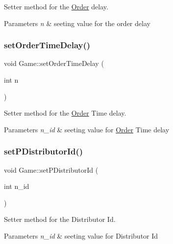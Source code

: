 Setter method for the \hyperlink{class_order}{Order} delay. 


\begin{DoxyParams}{Parameters}
{\em n} & seeting value for the order delay \\
\hline
\end{DoxyParams}
\mbox{\label{class_game_af127a9a8e81e7863d6cb73025181a62b}} 
\subsubsection{\texorpdfstring{set\+Order\+Time\+Delay()}{setOrderTimeDelay()}}
{\footnotesize\ttfamily void Game\+::set\+Order\+Time\+Delay (\begin{DoxyParamCaption}\item[{int}]{n }\end{DoxyParamCaption})}



Setter method for the \hyperlink{class_order}{Order} Time delay. 


\begin{DoxyParams}{Parameters}
{\em n\+\_\+id} & seeting value for \hyperlink{class_order}{Order} Time delay \\
\hline
\end{DoxyParams}
\mbox{\label{class_game_a98cdfae7d20ad4c4f7a34ed56e64ab7c}} 
\subsubsection{\texorpdfstring{set\+P\+Distributor\+Id()}{setPDistributorId()}}
{\footnotesize\ttfamily void Game\+::set\+P\+Distributor\+Id (\begin{DoxyParamCaption}\item[{int}]{n\+\_\+id }\end{DoxyParamCaption})}



Setter method for the Distributor Id. 


\begin{DoxyParams}{Parameters}
{\em n\+\_\+id} & seeting value for Distributor Id \\
\hline
\end{DoxyParams}
\mbox{\label{class_game_a727c19b36849f11e1e08d05af9162388}} 
